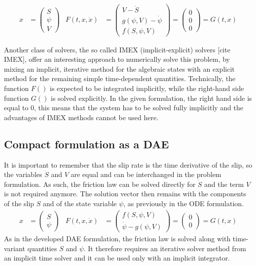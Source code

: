 \begin{align}
\label{eq:DAE_extended_formulation_SEAS}
	x &= \begin{pmatrix}
		S \\ \psi \\ V
	\end{pmatrix} & F(t, x,\dot{x}) &= \begin{pmatrix}
	 	V - \dot{S} \\ g(\psi, V) - \dot{\psi}  \\ f(S,\psi,V)
	\end{pmatrix} = \begin{pmatrix}
		0 \\ 0 \\ 0
	\end{pmatrix} = G(t,x)
\end{align}

Another class of solvers, the so called IMEX (implicit-explicit) solvers [cite IMEX], offer an interesting approach to numerically solve this problem, by mixing an implicit, iterative method for the algebraic states with an explicit method for the remaining simple time-dependent quantities. Technically, the function $F()$ is expected to be integrated implicitly, while the right-hand side function $G()$ is solved explicitly. In the given formulation, the right hand side is equal to 0, this means that the system has to be solved fully implicitly and the advantages of IMEX methods cannot be used here. 

\subsection{Compact formulation as a DAE}
It is important to remember that the slip rate is the time derivative of the slip, so the variables $\dot{S}$ and $V$ are equal and can be interchanged in the problem formulation. As such, the friction law can be solved directly for $\dot{S}$ and the term $V$ is not required anymore. The solution vector then remains with the components of the slip $S$ and of the state variable $\psi$, as previously in the ODE formulation.
 \begin{align}
	\label{eq:DAE_compact_formulation_SEAS}
	x &= \begin{pmatrix}
			S \\ \psi
	     \end{pmatrix} & F(t, x,\dot{x}) &= \begin{pmatrix}
												f(S,\psi,V) \\ \dot{\psi} - g(\psi, V)
											\end{pmatrix} = \begin{pmatrix}
																0 \\ 0
															\end{pmatrix} = G(t,x)
\end{align}
As in the developed DAE formulation, the friction law is solved along with time-variant quantities $S$ and $\psi$. It therefore requires an iterative solver method from an implicit time solver and it can be used only with an implicit integrator. \\

